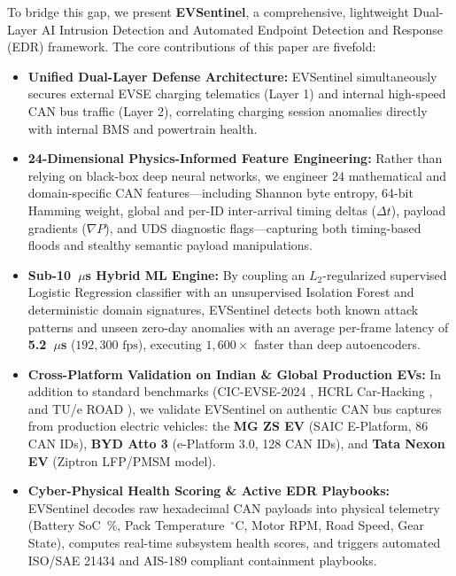 \documentclass[conference]{IEEEtran}
\begin{document}
To bridge this gap, we present \textbf{EVSentinel}, a comprehensive, lightweight Dual-Layer AI Intrusion Detection and Automated Endpoint Detection and Response (EDR) framework. The core contributions of this paper are fivefold:
\begin{itemize}
    \item \textbf{Unified Dual-Layer Defense Architecture:} EVSentinel simultaneously secures external EVSE charging telematics (Layer 1) and internal high-speed CAN bus traffic (Layer 2), correlating charging session anomalies directly with internal BMS and powertrain health.
    \item \textbf{24-Dimensional Physics-Informed Feature Engineering:} Rather than relying on black-box deep neural networks, we engineer 24 mathematical and domain-specific CAN features---including Shannon byte entropy, 64-bit Hamming weight, global and per-ID inter-arrival timing deltas ($\Delta t$), payload gradients ($\nabla P$), and UDS diagnostic flags---capturing both timing-based floods and stealthy semantic payload manipulations.
    \item \textbf{Sub-10~$\mu$s Hybrid ML Engine:} By coupling an $L_2$-regularized supervised Logistic Regression classifier with an unsupervised Isolation Forest and deterministic domain signatures, EVSentinel detects both known attack patterns and unseen zero-day anomalies with an average per-frame latency of \textbf{5.2~$\mu$s} ($192,300\text{ fps}$), executing $1,600\times$ faster than deep autoencoders.
    \item \textbf{Cross-Platform Validation on Indian \& Global Production EVs:} In addition to standard benchmarks (CIC-EVSE-2024 \cite{lashkari2024}, HCRL Car-Hacking \cite{song2020}, and TU/e ROAD \cite{verma2021}), we validate EVSentinel on authentic CAN bus captures from production electric vehicles: the \textbf{MG ZS EV} (SAIC E-Platform, 86 CAN IDs), \textbf{BYD Atto 3} (e-Platform 3.0, 128 CAN IDs), and \textbf{Tata Nexon EV} (Ziptron LFP/PMSM model).
    \item \textbf{Cyber-Physical Health Scoring \& Active EDR Playbooks:} EVSentinel decodes raw hexadecimal CAN payloads into physical telemetry (Battery SoC~\%, Pack Temperature~$^\circ$C, Motor RPM, Road Speed, Gear State), computes real-time subsystem health scores, and triggers automated ISO/SAE 21434 and AIS-189 compliant containment playbooks.
\end{itemize}
\end{document}
